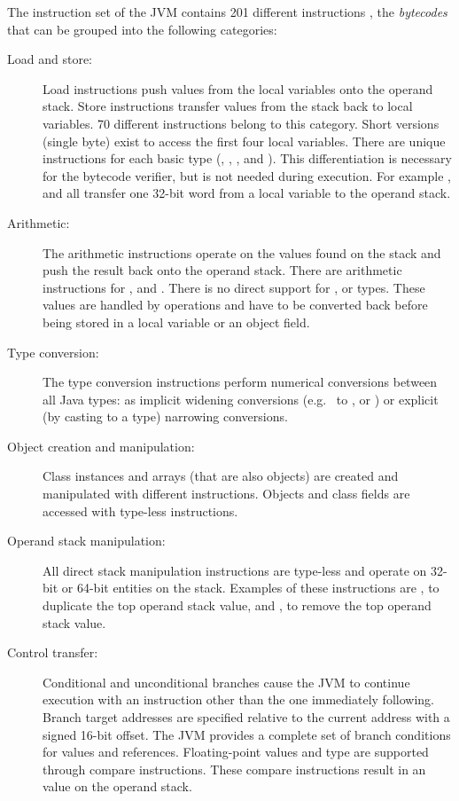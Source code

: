 The instruction set of the JVM contains 201 different instructions
\cite{jvm}, the \emph{bytecodes} that can be grouped into the
following categories:
%
\begin{description}
    \item[Load and store:]
Load instructions push values from the local variables onto the
operand stack. Store instructions transfer values from the stack
back to local variables. 70 different instructions belong to this
category. Short versions (single byte) exist to access the first
four local variables. There are unique instructions for each basic
type (, , ,  and
). This differentiation is necessary for the
bytecode verifier, but is not needed during execution. For example
,  and  all transfer one 32-bit
word from a local variable to the operand stack.

    \item[Arithmetic:]
The arithmetic instructions operate on the values found on the stack
and push the result back onto the operand stack. There are
arithmetic instructions for ,  and
. There is no direct support for ,
 or  types. These values are handled by
 operations and have to be converted back before being
stored in a local variable or an object field.

    \item[Type conversion:]
The type conversion instructions perform numerical conversions
between all Java types: as implicit widening conversions (e.g.\
 to ,  or ) or
explicit (by casting to a type) narrowing conversions.

    \item[Object creation and manipulation:]
Class instances and arrays (that are also objects) are created and
manipulated with different instructions. Objects and class fields
are accessed with type-less instructions.

    \item[Operand stack manipulation:]
All direct stack manipulation instructions are type-less and
operate on 32-bit or 64-bit entities on the stack. Examples of these
instructions are \code{dup}, to duplicate the top operand stack
value, and , to remove the top operand stack value.

    \item[Control transfer:]
Conditional and unconditional branches cause the JVM to continue
execution with an instruction other than the one immediately
following. Branch target addresses are specified relative to the
current address with a signed 16-bit offset. The JVM provides a
complete set of branch conditions for  values and
references. Floating-point values and type  are
supported through compare instructions. These compare instructions
result in an \code{int} value on the operand stack.


\end{description}
